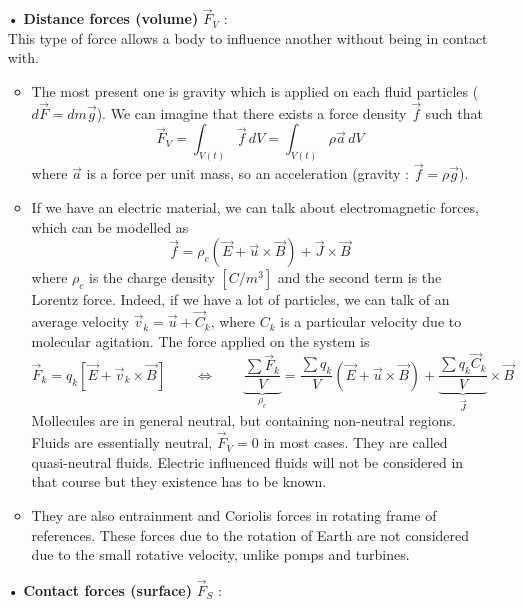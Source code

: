 	\begin{itemize}
		\item[•] \textbf{Distance forces (volume)} $\vec{F}_V$ : \\
		This type of force allows a body to influence another without being in contact with. 
		\begin{itemize}
			\item The most present one is gravity which is applied on each fluid particles ($d\vec{F} = dm \vec{g}$). We can imagine that there exists a force density $\vec{f}$ such that 
		\begin{equation}
			\vec{F}_V = \int _{V(t)} \vec{f} \, dV = \int _{V(t)} \rho \vec{a} \, dV
			\label{eq:1.25}
		\end{equation}
		where $\vec{a}$ is a force per unit mass, so an acceleration (gravity : $\vec{f} = \rho \vec{g}$). 
		
			\item If we have an electric material, we can talk about electromagnetic forces, which can be modelled as 
		\begin{equation}
			\vec{f} = \rho _c (\vec{E}+\vec{u}\times \vec{B}) + \vec{J}\times \vec{ B}
		\end{equation}
		where $\rho _c$ is the charge density $[C/m^3]$ and the second term is the Lorentz force. Indeed, if we have a lot of particles, we can talk of an average velocity $\vec{v}_k = \vec{u}+\vec{C}_k$, where $C_k$ is a particular velocity due to molecular agitation.  The force applied on the system is 
		\begin{equation}
			\vec{F}_k = q_k [\vec{E} + \vec{v}_k \times \vec{B}] \qquad \Leftrightarrow \qquad \underbrace{\frac{\sum \vec{F}_k}{V}}_{\rho _c} = \frac{\sum q_k}{V} (\vec{E}+\vec{u}\times \vec{B}) + \underbrace{\frac{\sum q_k \vec{C}_k}{V}}_{\vec{J}} \times \vec{B}
		\end{equation}
		Mollecules are in general neutral, but containing non-neutral regions. Fluids are essentially neutral, $\vec{F}_V = 0$ in most cases. They are called quasi-neutral fluids. Electric influenced fluids will not be considered in that course but they existence has to be known. 
		
			\item They are also entrainment and Coriolis forces in rotating frame of references. These forces due to the rotation of Earth are not considered due to the small rotative velocity, unlike pomps and turbines. \\
		\end{itemize}
		\item[•] \textbf{Contact forces (surface)} $\vec{F}_S$ : \\
		

\end{itemize}
